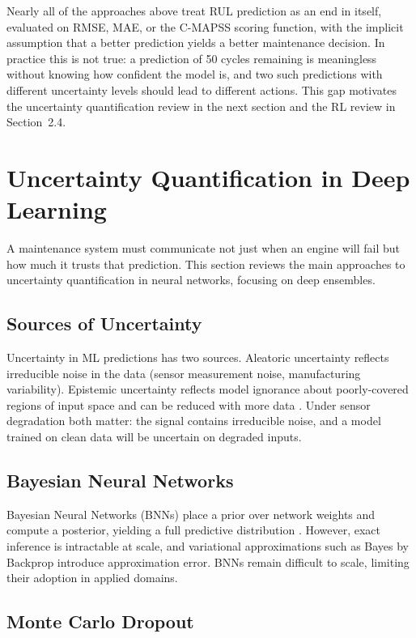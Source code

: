 \documentclass[12pt,a4paper]{report}
\begin{document}
Nearly all of the approaches above treat RUL prediction as an end in itself, evaluated on RMSE, MAE, or the C-MAPSS scoring function, with the implicit assumption that a better prediction yields a better maintenance decision. In practice this is not true: a prediction of 50 cycles remaining is meaningless without knowing how confident the model is, and two such predictions with different uncertainty levels should lead to different actions. This gap motivates the uncertainty quantification review in the next section and the RL review in Section~2.4.

\section{Uncertainty Quantification in Deep Learning}

A maintenance system must communicate not just when an engine will fail but how much it trusts that prediction. This section reviews the main approaches to uncertainty quantification in neural networks, focusing on deep ensembles.

\subsection{Sources of Uncertainty}

Uncertainty in ML predictions has two sources. Aleatoric uncertainty reflects irreducible noise in the data (sensor measurement noise, manufacturing variability). Epistemic uncertainty reflects model ignorance about poorly-covered regions of input space and can be reduced with more data \citep{der2009aleatory}. Under sensor degradation both matter: the signal contains irreducible noise, and a model trained on clean data will be uncertain on degraded inputs.

\subsection{Bayesian Neural Networks}

Bayesian Neural Networks (BNNs) place a prior over network weights and compute a posterior, yielding a full predictive distribution \citep{neal2012bayesian}. However, exact inference is intractable at scale, and variational approximations such as Bayes by Backprop \citep{blundell2015weight} introduce approximation error. BNNs remain difficult to scale, limiting their adoption in applied domains.

\subsection{Monte Carlo Dropout}
\end{document}
